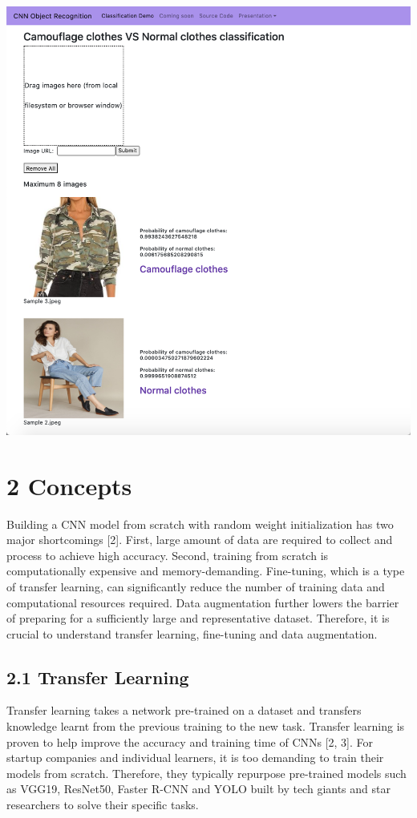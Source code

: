 \documentclass[12pt]{article}
\begin{document}
\begin{center}
	\includegraphics[width=0.6\columnwidth]{screenshot.png} %
\end{center}

\section*{\large{2 \hspace{10pt} Concepts}}
Building a CNN model from scratch with random weight initialization has two major shortcomings [2]. First, large amount of data are required to collect and process to achieve high accuracy. Second, training from scratch is computationally expensive and memory-demanding. Fine-tuning, which is a type of transfer learning, can significantly reduce the number of training data and computational resources required. Data augmentation further lowers the barrier of preparing for a sufficiently large and representative dataset. Therefore, it is crucial to understand transfer learning, fine-tuning and data augmentation.

\subsection*{2.1 \hspace{10pt} Transfer Learning}
Transfer learning takes a network pre-trained on a dataset and transfers knowledge learnt from the previous training to the new task. Transfer learning is proven to help improve the accuracy and training time of CNNs [2, 3].
For startup companies and individual learners, it is too demanding to train their models from scratch. Therefore, they typically repurpose pre-trained models such as VGG19, ResNet50, Faster R-CNN and YOLO built by tech giants and star researchers to solve their specific tasks.
\end{document}
